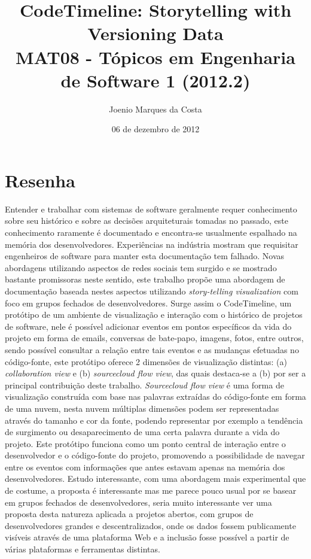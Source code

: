 \documentclass[12pt]{article}
\title{CodeTimeline: Storytelling with Versioning Data\cite{CodeTimeline} \\
 \large MAT08 - Tópicos em Engenharia de Software 1 (2012.2)}
\author{Joenio Marques da Costa}
\date{06 de dezembro de 2012}
\begin{document}
\maketitle

\section*{Resenha}

Entender e trabalhar com sistemas de software geralmente requer conhecimento
sobre seu histórico e sobre as decisões arquiteturais tomadas no passado, este
conhecimento raramente é documentado e encontra-se usualmente espalhado na
memória dos desenvolvedores. Experiências na indústria mostram que requisitar
engenheiros de software para manter esta documentação tem falhado. Novas
abordagens utilizando aspectos de redes sociais tem surgido e se mostrado
bastante promissoras neste sentido, este trabalho propõe uma abordagem de
documentação baseada nestes aspectos utilizando {\it story-telling
visualization} com foco em grupos fechados de desenvolvedores. Surge assim o
{\sc CodeTimeline}, um protótipo de um ambiente de visualização e interação com
o histórico de projetos de software, nele é possível adicionar eventos em
pontos específicos da vida do projeto em forma de emails, conversas de
bate-papo, imagens, fotos, entre outros, sendo possível consultar a relação
entre tais eventos e as mudanças efetuadas no código-fonte, este protótipo
oferece 2 dimensões de visualização distintas: (a) {\it collaboration view} e
(b) {\it sourcecloud flow view}, das quais destaca-se a (b) por ser a principal
contribuição deste trabalho. {\it Sourcecloud flow view} é uma forma de
visualização construída com base nas palavras extraídas do código-fonte em
forma de uma nuvem, nesta nuvem múltiplas dimensões podem ser representadas
através do tamanho e cor da fonte, podendo representar por exemplo a tendência
de surgimento ou desaparecimento de uma certa palavra durante a vida do
projeto. Este protótipo funciona como um ponto central de interação entre o
desenvolvedor e o código-fonte do projeto, promovendo a possibilidade de
navegar entre os eventos com informações que antes estavam apenas na memória
dos desenvolvedores. Estudo interessante, com uma abordagem mais experimental
que de costume, a proposta é interessante mas me parece pouco usual por se
basear em grupos fechados de desenvolvedores, seria muito interessante ver uma
proposta desta natureza aplicada a projetos abertos, com grupos de
desenvolvedores grandes e descentralizados, onde os dados fossem publicamente
visíveis através de uma plataforma Web e a inclusão fosse possível a partir de
várias plataformas e ferramentas distintas.


\end{document}
